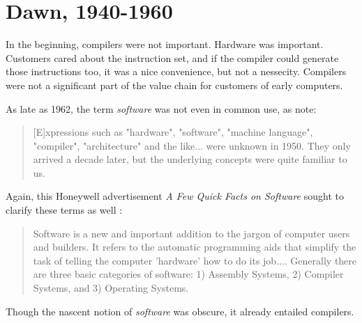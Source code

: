 \chapter{Dawn, 1940-1960}

In the beginning, compilers were not important.
Hardware was important.
Customers cared about the instruction set,
and if the compiler could generate those instructions too,
it was a nice convenience, but not a nessecity.
Compilers were not a significant part of the value chain for customers of early computers.

As late as 1962, the term \textit{software} was not even in common use, as \citeauthor{the_first_computers_2002} note\cite{the_first_computers_2002}:

\begin{quotation}
[E]xpressions such as "hardware", "software", "machine language", "compiler",
"architecture" and the like... were unknown in 1950. They only arrived a decade
later, but the underlying concepts were quite familiar to us.
\end{quotation}

Again, this Honeywell advertisement \textit{A Few Quick Facts on Software} sought to clarify these terms as well \cite[ch.5]{new_history_of_modern_computing}:

\begin{quotation}
Software is a new and important addition to the jargon of computer users and builders.
It refers to the automatic programming aids that simplify the task of telling the computer 'hardware' how to do its job....
Generally there are three basic categories of software:
1) Assembly Systems, 2) Compiler Systems, and 3) Operating Systems.
\end{quotation}

Though the nascent notion of \textit{software} was obscure, it already entailed compilers.


